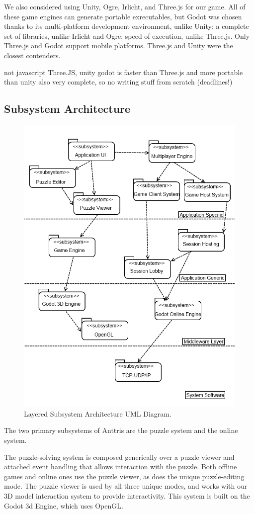 \documentclass[12pt]{article}
\begin{document}
We also considered using Unity, Ogre, Irlicht, and Three.js for our
game. All of these game engines can generate portable exrecutables, but Godot
was chosen thanks to its multi-platform development environment, unlike Unity;
a complete set of libraries, unlike Irlicht and Ogre; speed of execution,
unlike Three.js. Only Three.js and Godot support mobile platforms.
Three.js and Unity were the closest contenders.

not javascript Three.JS, unity
godot is faster than Three.js and more portable than unity
also very complete, so no writing stuff from scratch (deadlines!)


\subsection{Subsystem Architecture}
\begin{figure}[H]
    \centering
    \includegraphics[width=0.8\linewidth]{subsys_arch.png}
    \caption{Layered Subsystem Architecture UML Diagram.}
\end{figure}
The two primary subsystems of Anttris are the puzzle system and the online system.

The puzzle-solving system is composed generically over a puzzle viewer and attached event
handling that allows interaction with the puzzle. Both offline games and online ones use
the puzzle viewer, as does the unique puzzle-editing mode. The puzzle viewer is used by
all three unique modes, and works with our 3D model interaction system to provide
interactivity. This system is built on the Godot 3d Engine, which uses OpenGL.
\end{document}
